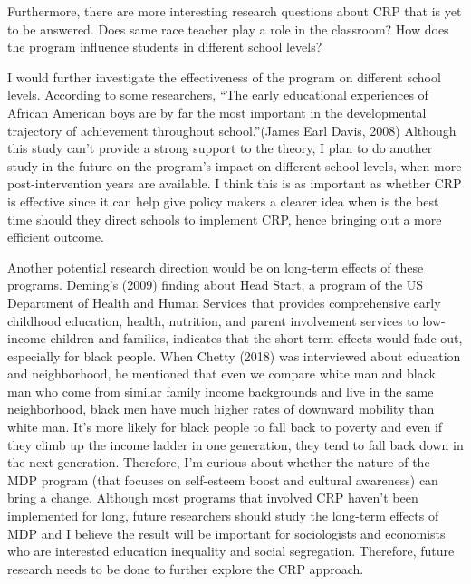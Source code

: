 Furthermore, there are more interesting research questions about CRP that is yet to be answered. Does same race teacher play a role in the classroom? How does the program influence students in different school levels?

I would further investigate the effectiveness of the program on different school levels. According to some researchers,  “The early educational experiences of African American boys are by far the most important in the developmental trajectory of achievement throughout school.”(James Earl Davis, 2008) Although this study can't provide a strong support to the theory, I plan to do another study in the future on the program's impact on different school levels, when more post-intervention years are available. I think this is as important as whether CRP is effective since it can help give policy makers a clearer idea when is the best time should they direct schools to implement CRP, hence bringing out a more efficient outcome.

Another potential research direction would be on long-term effects of these programs. Deming’s (2009) finding about Head Start, a program of the US Department of Health and Human Services that provides comprehensive early childhood education, health, nutrition, and parent involvement services to low-income children and families, indicates that the short-term effects would fade out, especially for black people. When Chetty (2018) was interviewed about education and neighborhood, he mentioned that even we compare white man and black man who come from similar family income backgrounds and live in the same neighborhood, black men have much higher rates of downward mobility than white man. It’s more likely for black people to fall back to poverty and even if they climb up the income ladder in one generation, they tend to fall back down in the next generation. Therefore, I’m curious about whether the nature of the MDP program (that focuses on self-esteem boost and cultural awareness) can bring a change. Although most programs that involved CRP haven't been implemented for long, future researchers should study the long-term effects of MDP and I believe the result will be important for sociologists and economists who are interested education inequality and social segregation. Therefore, future research needs to be done to further explore the CRP approach.